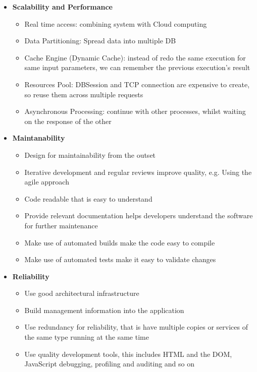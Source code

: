 
%

\begin{itemize}
	\item \textbf{Scalability and Performance}
		\begin{itemize}
			\item Real time access: combining system with Cloud computing
			\item Data Partitioning: Spread data into multiple DB
			\item Cache Engine (Dynamic Cache): instead of redo the same execution for same input parameters, we can remember the previous execution's result
			\item Resources Pool: DBSession and TCP connection are expensive to create, so reuse them across multiple requests
			\item Asynchronous Processing: continue with other processes, whilst waiting on the response of the other
		\end{itemize}
	\item \textbf{Maintanability}
		\begin{itemize}
			\item Design for maintainability from the outset
			\item Iterative development and regular reviews improve quality, e.g. Using the agile approach
			\item Code readable that is easy to understand
			\item Provide relevant documentation helps developers understand the software for further maintenance
			\item Make use of automated builds make the code easy to compile
			\item Make use of automated tests make it easy to validate changes
		\end{itemize}
	\item \textbf{Reliability}
		\begin{itemize}
			\item Use good architectural infrastructure
			\item Build management information into the application
			\item Use redundancy for reliability, that is have multiple copies or services of the same type running at the same time
			\item Use quality development tools, this includes HTML and the DOM, JavaScript debugging, profiling and auditing and so on

\end{itemize}
\end{itemize}
